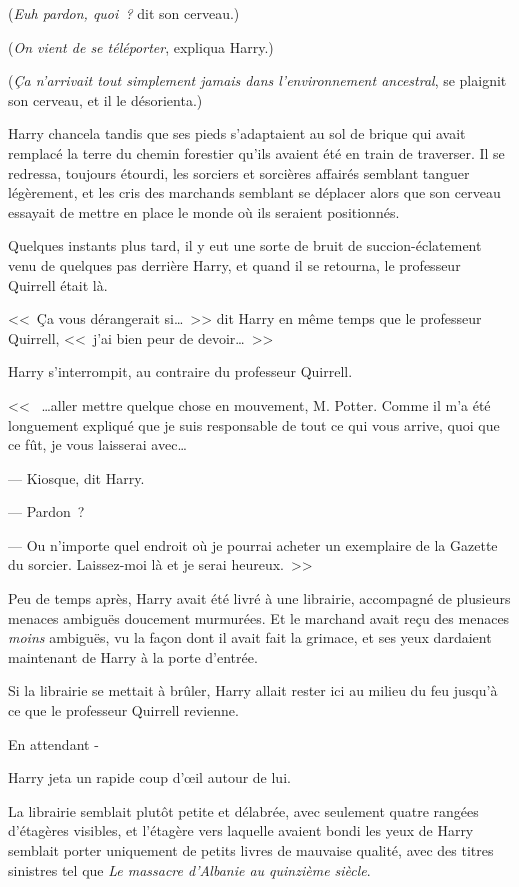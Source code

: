 (\emph{Euh pardon, quoi~?} dit son cerveau.)

(\emph{On vient de se téléporter}, expliqua Harry.)

(\emph{Ça n'arrivait tout simplement jamais dans l'environnement ancestral}, se plaignit son cerveau, et il le désorienta.)

Harry chancela tandis que ses pieds s'adaptaient au sol de brique qui avait remplacé la terre du chemin forestier qu'ils avaient été en train de traverser. Il se redressa, toujours étourdi, les sorciers et sorcières affairés semblant tanguer légèrement, et les cris des marchands semblant se déplacer alors que son cerveau essayait de mettre en place le monde où ils seraient positionnés.

Quelques instants plus tard, il y eut une sorte de bruit de succion-éclatement venu de quelques pas derrière Harry, et quand il se retourna, le professeur Quirrell était là.

<<~Ça vous dérangerait si…~>> dit Harry en même temps que le professeur Quirrell, <<~j'ai bien peur de devoir…~>>

Harry s'interrompit, au contraire du professeur Quirrell.

<<~ …aller mettre quelque chose en mouvement, M. Potter. Comme il m'a été longuement expliqué que je suis responsable de tout ce qui vous arrive, quoi que ce fût, je vous laisserai avec…

--- Kiosque, dit Harry.

--- Pardon~?

--- Ou n'importe quel endroit où je pourrai acheter un exemplaire de la Gazette du sorcier. Laissez-moi là et je serai heureux.~>>

Peu de temps après, Harry avait été livré à une librairie, accompagné de plusieurs menaces ambiguës doucement murmurées. Et le marchand avait reçu des menaces \emph{moins} ambiguës, vu la façon dont il avait fait la grimace, et ses yeux dardaient maintenant de Harry à la porte d'entrée.

Si la librairie se mettait à brûler, Harry allait rester ici au milieu du feu jusqu'à ce que le professeur Quirrell revienne.

En attendant -

Harry jeta un rapide coup d'œil autour de lui.

La librairie semblait plutôt petite et délabrée, avec seulement quatre rangées d'étagères visibles, et l'étagère vers laquelle avaient bondi les yeux de Harry semblait porter uniquement de petits livres de mauvaise qualité, avec des titres sinistres tel que \emph{Le massacre d'Albanie au quinzième siècle}.

